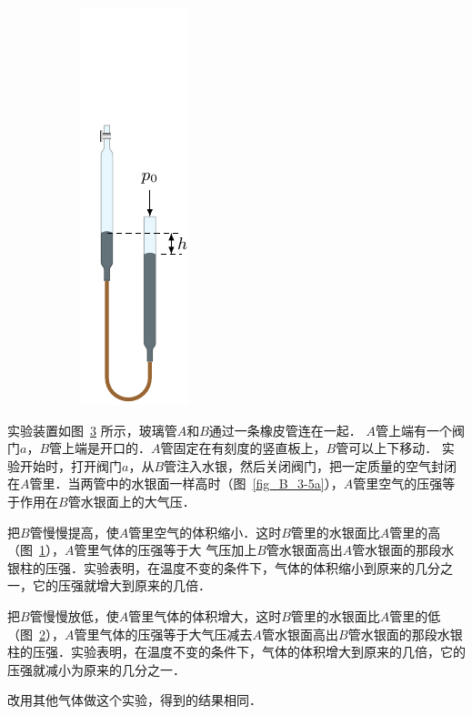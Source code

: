 \begin{figure}[htbp]
\begin{subfigure}{0.3\linewidth}
        \caption{}\label{fig_B_3-5b}
    \end{subfigure}
    \hfil
    \begin{subfigure}{0.3\linewidth}
        \centering
        \includegraphics{fig/B/3-5c.pdf}
        \caption{}\label{fig_B_3-5c}
    \end{subfigure}
    \caption{}\label{fig_B_3-5}
\end{figure}

实验装置如图~\ref{fig_B_3-5} 所示，玻璃管$A$和$B$通过一条橡皮管连在一起．
$A$管上端有一个阀门$a$，$B$管上端是开口的．$A$管固定在有刻度的竖直板上，$B$管可以上下移动．
实验开始时，打开阀门$a$，从$B$管注入水银，然后关闭阀门，把一定质量的空气封闭在$A$管里．当两管中的水银面一样高时（图~\ref{fig_B_3-5a}），$A$管里空气的压强等于作用在$B$管水银面上的大气压．

把$B$管慢慢提高，使$A$管里空气的体积缩小．这时$B$管里的水银面比$A$管里的高（图~\ref{fig_B_3-5b}），$A$管里气体的压强等于大
气压加上$B$管水银面高出$A$管水银面的那段水银柱的压强．实验表明，在温度不变的条件下，气体的体积缩小到原来的几分之一，它的压强就增大到原来的几倍．

把$B$管慢慢放低，使$A$管里气体的体积增大，这时$B$管里的水银面比$A$管里的低（图~\ref{fig_B_3-5c}），$A$管里气体的压强等于大气压减去$A$管水银面高出$B$管水银面的那段水银柱的压强．实验表明，在温度不变的条件下，气体的体积增大到原来的几倍，它的压强就减小为原来的几分之一．

改用其他气体做这个实验，得到的结果相同．

